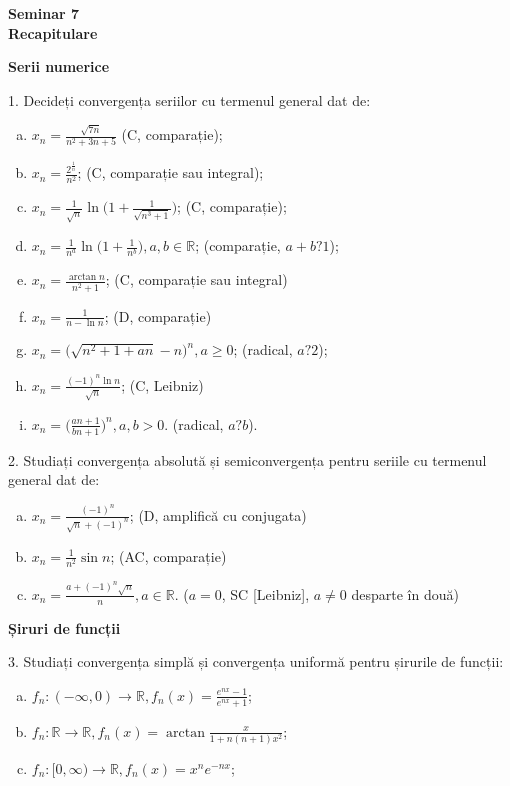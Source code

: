 \documentclass[11pt,a4paper]{article}
\newcommand\RR{\mathbb{R}}
\theoremstyle{dotless}
\theoremstyle{dotlessdr}
\begin{document}
\begin{center}
  {\large\textbf{Seminar 7 \\ Recapitulare}}
\end{center}

\textbf{Serii numerice}

1. Decideți convergența seriilor cu termenul general dat de:
\begin{enumerate}[(a)]
\item $x_n = \frac{\sqrt{7n}}{n^2 + 3n + 5}$ \hfill (C, comparație);
\item $x_n = \frac{2^{\frac{1}{n}}}{n^2}$; \hfill (C, comparație sau integral);
\item $x_n = \frac{1}{\sqrt{n}} \ln \Big( 1 + \frac{1}{\sqrt{n^3 + 1}} \Big)$; \hfill (C, comparație);
\item $x_n = \frac{1}{n^a} \ln \Big( 1 + \frac{1}{n^b} \Big), a, b \in \RR$; \hfill (comparație, $a + b ? 1$);
\item $x_n = \frac{\arctan n}{n^2 + 1}$; \hfill (C, comparație sau integral)
\item $x_n = \frac{1}{n - \ln n}$; \hfill (D, comparație)
\item $x_n = \Big( \sqrt{n^2 + 1 + an} - n \Big)^n, a \geq 0$; \hfill (radical, $a ? 2$);
\item $x_n = \frac{(-1)^n \ln n}{\sqrt{n}}$; \hfill (C, Leibniz)
\item $x_n = \Big(\frac{an + 1}{bn + 1}\Big)^n, a, b > 0$. \hfill (radical, $a ? b$).
\end{enumerate}

\vspace{1cm}

2. Studiați convergența absolută și semiconvergența pentru seriile cu termenul general
dat de:
\begin{enumerate}[(a)]
\item $x_n = \frac{(-1)^n}{\sqrt{n} + (-1)^n}$; \hfill (D, amplifică cu conjugata)
\item $x_n = \frac{1}{n^2} \sin n$; \hfill (AC, comparație)
\item $x_n = \frac{a + (-1)^n \sqrt{n}}{n}, a \in \RR$. \hfill ($a = 0$, SC [Leibniz], $a \neq 0$ desparte în două)
\end{enumerate}

\vspace{1cm}

\textbf{Șiruri de funcții}

3. Studiați convergența simplă și convergența uniformă pentru șirurile
de funcții:
\begin{enumerate}[(a)]
\item $f_n : (-\infty, 0) \to \RR, f_n(x) = \frac{e^{nx} - 1}{e^{nx} + 1}$;
\item $f_n : \RR \to \RR, f_n(x) = \arctan \frac{x}{1 + n(n + 1)x^2}$;
\item $f_n : [0, \infty) \to \RR, f_n(x) = x^n e^{-nx}$;
\end{enumerate}
\end{document}
